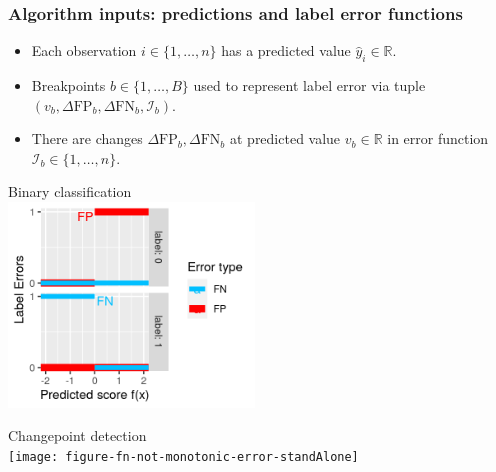\documentclass[t]{beamer}
\begin{document}
\begin{frame}
  \frametitle{Algorithm inputs: predictions and label error functions}

  \begin{itemize}
  \item Each observation $i\in\{1,\dots,n\}$ has a predicted value
    $\hat y_i\in\mathbb R$.
  \item Breakpoints
  $b\in\{1,\dots, B\}$ used to represent label error via tuple
  $(v_b, \Delta\text{FP}_b, \Delta\text{FN}_b, \mathcal I_b)$.
\item There are changes $\Delta\text{FP}_b, \Delta\text{FN}_b$ at
  predicted value $v_b\in\mathbb R$ in error function
  $\mathcal I_b\in\{1,\dots,n\}$.
  \end{itemize}

  \parbox{0.49\textwidth}{
    Binary classification\\
  \includegraphics[width=0.49\textwidth]{figure-more-than-one-binary-errors}
}\parbox{0.49\textwidth}{
  Changepoint detection\\
  \texttt{[image: figure-fn-not-monotonic-error-standAlone]}}

\end{frame}
\end{document}
